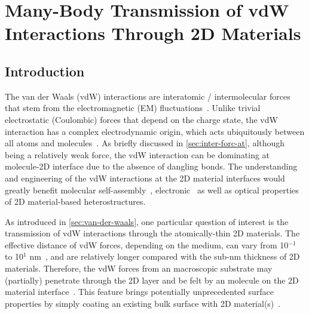 \chapter{Many-Body Transmission of vdW Interactions Through 2D Materials}
\label{ch:vdw}
\renewcommand*\imgdir{img/vdw/}

%

\vspace{1em}


\section{Introduction}
\label{sec:vdw-introduction}
The van der Waals (vdW) interactions are inter\-atomic /
inter\-molecular forces that stem from the electromagnetic (EM)
fluctuations~\cite{Israelachvili_2011_book,Woods_2016_rev_vdw,parsegian_van_2010_book}.
%
Unlike trivial electrostatic (Coulombic) forces that depend on the
charge state, the vdW interaction has a complex electro\-dynamic
origin, which acts ubiquitously between all atoms and molecules~\cite{Israelachvili_2011_book,Hermann_2017_vdW_rev}.
%
As briefly discussed in \autoref{sec:inter-forc-at}, although being a
relatively weak force, the vdW interaction can be dominating at
molecule-2D interface due to the absence of dangling bonds.
%
The understanding and engineering of the vdW interactions at the 2D
material interfaces would greatly benefit molecular
self-assembly~\cite{Kumar_2017_rev_assemb_2D},
electronic~\cite{Wang_2015_phys_chem_tuning_TMDC,Lazar_2013} as well
as optical properties~\cite{Geim_2013_2D_vdw_Het,Novoselov_2016_vdW}
of 2D material-based hetero\-structures.
%

As introduced in \autoref{sec:van-der-waals}, one particular question
of interest is the transmission of vdW interactions through the
atomically-thin 2D materials.
%
The effective distance of vdW forces, depending on the medium, can
vary from 10$^{-1}$ to 10$^{1}$ nm~\cite{Israelachvili_2011_book}, and are
relatively longer compared with the sub-nm thickness of 2D materials.
%
Therefore, the vdW forces from an macroscopic substrate may
(partially) penetrate through the 2D layer and be felt by an molecule
on the 2D material interface~\cite{shih_2013_wetting_natmat}.
%
This feature
brings potentially unprecedented surface properties by simply coating
an existing bulk surface with 2D
material(s)~\cite{Prasai_2012_coating,rafiee_2012_transparency,Tsoi_2014_vdW_screening_2D}.
%


